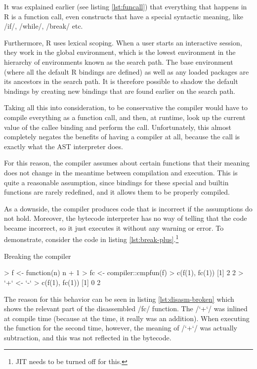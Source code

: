 {It was explained earlier (see listing \ref{lst:funcall}) that everything that happens in R is a function call, even constructs that have a special syntactic meaning, like \rinline/if/, \rinline/while/, \rinline/break/ etc.

Furthermore, R uses lexical scoping. When a user starts an interactive session, they work in the global environment, which is the lowest environment in the hierarchy of environments known as the search path. The base environment (where all the default R bindings are defined) as well as any loaded packages are its ancestors in the search path. It is therefore possible to shadow the default bindings by creating new bindings that are found earlier on the search path.

Taking all this into consideration, to be conservative the compiler would have to compile everything as a function call, and then, at runtime, look up the current value of the callee binding and perform the call. Unfortunately, this almost completely negates the benefits of having a compiler at all, because the call is exactly what the AST interpreter does.

For this reason, the compiler assumes about certain functions that their meaning does not change in the meantime between compilation and execution. This is quite a reasonable assumption, since bindings for these special and builtin functions are rarely redefined, and it allows them to be properly compiled.

As a downside, the compiler produces code that is incorrect if the assumptions do not hold. Moreover, the bytecode interpreter has no way of telling that the code became incorrect, so it just executes it without any warning or error. To demonstrate, consider the code in listing \ref{lst:break-plus}.\footnote{JIT needs to be turned off for this.}

\begin{listing}[htbp]
  \caption{\label{lst:break-plus}Breaking the compiler}
  \begin{rcode}
> f <- function(n) n + 1
> fc <- compiler::cmpfun(f)
> c(f(1), fc(1))
[1] 2 2
> `+` <- `-`
> c(f(1), fc(1))
[1] 0 2
  \end{rcode}
\end{listing}

The reason for this behavior can be seen in listing \ref{lst:disasm-broken} which shows the relevant part of the disassembled \rinline/fc/ function. The \rinline/`+`/ was inlined at compile time (because at the time, it really was an addition). When executing the function for the second time, however, the meaning of \rinline/`+`/ was actually subtraction, and this was not reflected in the bytecode.

}
